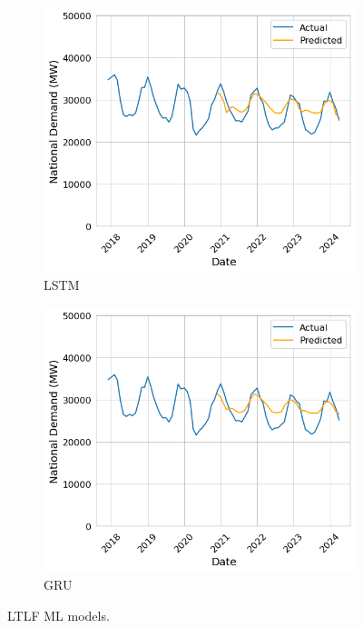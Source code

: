\documentclass[12pt]{scrreprt}
\begin{document}
\begin{figure}[b!]
    \centering
    \begin{subfigure}{.5\textwidth}
        \centering
        \includegraphics[width=\linewidth]{Images/ltoc_plot.png}
        \caption{LSTM}
        \label{fig:ltoc_plot}
    \end{subfigure}%
    \begin{subfigure}{.5\textwidth}
        \centering
        \includegraphics[width=\linewidth]{Images/gltoc_plot.png}
        \caption{GRU}
        \label{fig:gltoc_plot}
    \end{subfigure}
    \caption{LTLF ML models.}
    \label{fig:ltlf_ml}
\end{figure}
\end{document}
